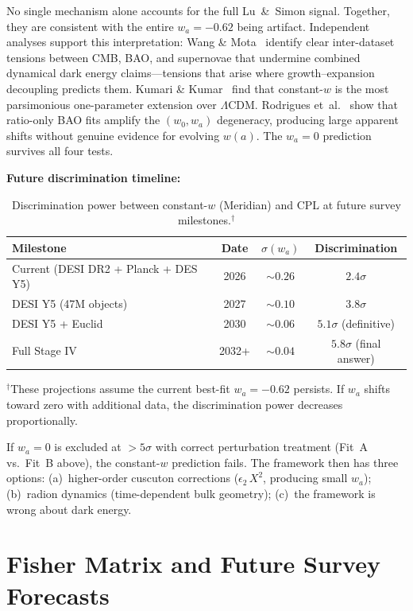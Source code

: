 No single mechanism alone accounts for the full Lu~\&~Simon signal. Together, they are consistent with the entire $w_a = -0.62$ being artifact. Independent analyses support this interpretation: Wang \& Mota~\cite{ch2:WangMota2025} identify clear inter-dataset tensions between CMB, BAO, and supernovae that undermine combined dynamical dark energy claims---tensions that arise where growth--expansion decoupling predicts them. Kumari \& Kumar~\cite{ch2:KumariKumar2026} find that constant-$w$ is the most parsimonious one-parameter extension over $\Lambda$CDM. Rodrigues et~al.~\cite{ch2:Rodrigues2025} show that ratio-only BAO fits amplify the $(w_0, w_a)$ degeneracy, producing large apparent shifts without genuine evidence for evolving $w(a)$. The $w_a = 0$ prediction survives all four tests.

\textbf{Future discrimination timeline:}
\begin{table}[htbp]
\centering
\caption{Discrimination power between constant-$w$ (Meridian) and CPL at future survey milestones.$^{\dagger}$}
\label{tab:2-discrimination-timeline}
\begin{tabular}{lccc}
\toprule
Milestone & Date & $\sigma(w_a)$ & Discrimination \\
\midrule
Current (DESI DR2 + Planck + DES Y5) & 2026 & $\sim 0.26$ & $2.4\sigma$ \\
DESI Y5 (47M objects) & 2027 & $\sim 0.10$ & $3.8\sigma$ \\
DESI Y5 + Euclid & 2030 & $\sim 0.06$ & $5.1\sigma$ (definitive) \\
Full Stage IV & 2032+ & $\sim 0.04$ & $5.8\sigma$ (final answer) \\
\bottomrule
\end{tabular}

\smallskip
{\footnotesize $^{\dagger}$These projections assume the current best-fit $w_a = -0.62$ persists. If $w_a$ shifts toward zero with additional data, the discrimination power decreases proportionally.}
\end{table}

If $w_a = 0$ is excluded at $> 5\sigma$ with correct perturbation treatment (Fit~A vs.\ Fit~B above), the constant-$w$ prediction fails. The framework then has three options: (a)~higher-order cuscuton corrections ($\epsilon_2\,X^2$, producing small $w_a$); (b)~radion dynamics (time-dependent bulk geometry); (c)~the framework is wrong about dark energy.

\section{Fisher Matrix and Future Survey Forecasts}
\label{sec:2-Fisher}

